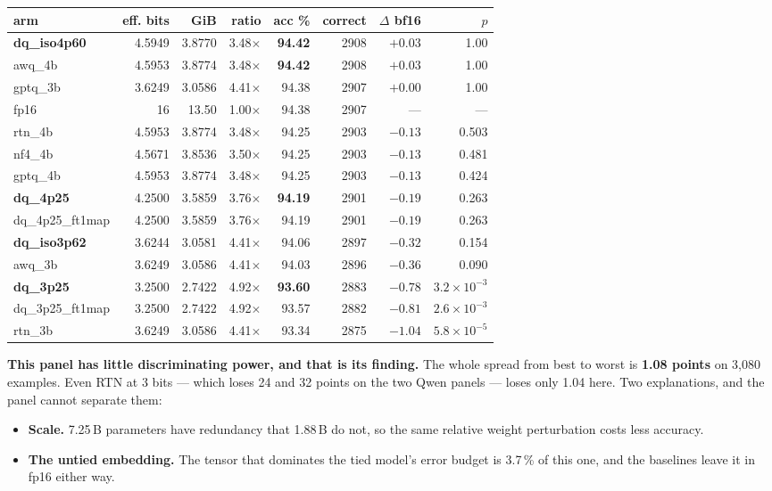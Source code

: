 \documentclass[11pt]{article}
\newcommand{\x}{\texorpdfstring{$\times$}{x}}
\newcommand{\pct}{\,\%}
\newcommand{\e}[2]{$#1\!\times\!10^{#2}$}
\newcommand{\best}[1]{\textbf{#1}}
\begin{document}
\begin{center}\small
\begin{tabular}{@{}lrrrrrrr@{}}
\toprule
arm & eff. bits & GiB & ratio & acc \% & correct & $\Delta$ bf16 & $p$ \\
\midrule
\textbf{dq\_iso4p60} & 4.5949 & 3.8770 & 3.48\x & \best{94.42} & 2908 & $+0.03$ & 1.00 \\
awq\_4b & 4.5953 & 3.8774 & 3.48\x & \best{94.42} & 2908 & $+0.03$ & 1.00 \\
gptq\_3b & 3.6249 & 3.0586 & 4.41\x & 94.38 & 2907 & $+0.00$ & 1.00 \\
fp16 & 16 & 13.50 & 1.00\x & 94.38 & 2907 & --- & --- \\
rtn\_4b & 4.5953 & 3.8774 & 3.48\x & 94.25 & 2903 & $-0.13$ & 0.503 \\
nf4\_4b & 4.5671 & 3.8536 & 3.50\x & 94.25 & 2903 & $-0.13$ & 0.481 \\
gptq\_4b & 4.5953 & 3.8774 & 3.48\x & 94.25 & 2903 & $-0.13$ & 0.424 \\
\textbf{dq\_4p25} & 4.2500 & 3.5859 & 3.76\x & \best{94.19} & 2901 & $-0.19$ & 0.263 \\
dq\_4p25\_ft1map & 4.2500 & 3.5859 & 3.76\x & 94.19 & 2901 & $-0.19$ & 0.263 \\
\textbf{dq\_iso3p62} & 3.6244 & 3.0581 & 4.41\x & 94.06 & 2897 & $-0.32$ & 0.154 \\
awq\_3b & 3.6249 & 3.0586 & 4.41\x & 94.03 & 2896 & $-0.36$ & 0.090 \\
\textbf{dq\_3p25} & 3.2500 & 2.7422 & 4.92\x & \best{93.60} & 2883 & $-0.78$ & \e{3.2}{-3} \\
dq\_3p25\_ft1map & 3.2500 & 2.7422 & 4.92\x & 93.57 & 2882 & $-0.81$ & \e{2.6}{-3} \\
rtn\_3b & 3.6249 & 3.0586 & 4.41\x & 93.34 & 2875 & $-1.04$ & \e{5.8}{-5} \\
\bottomrule
\end{tabular}
\end{center}

\textbf{This panel has little discriminating power, and that is its finding.} The whole spread
from best to worst is \textbf{1.08 points} on 3{,}080 examples. Even RTN at 3 bits --- which
loses 24 and 32 points on the two Qwen panels --- loses only 1.04 here. Two explanations, and the
panel cannot separate them:

\begin{itemize}[leftmargin=1.4em]
\item \textbf{Scale.} 7.25\,B parameters have redundancy that 1.88\,B do not, so the same
relative weight perturbation costs less accuracy.
\item \textbf{The untied embedding.} The tensor that dominates the tied model's error budget is
3.7\pct{} of this one, and the baselines leave it in fp16 either way.
\end{itemize}
\end{document}
